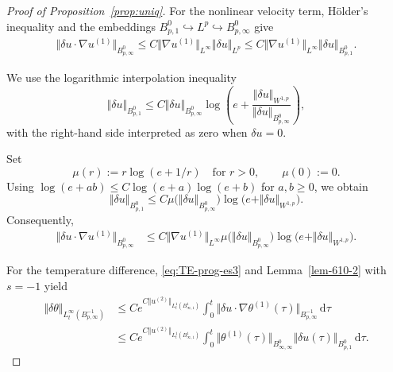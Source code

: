 \documentclass[reqno,11pt,a4paper]{amsart}
\newcommand{\dd}{\mathrm{d}}
\begin{document}
\begin{proof}[Proof of Proposition~\ref{prop:uniq}]
For the nonlinear velocity term,
H\"older's inequality and the embeddings
$B^0_{p,1}\hookrightarrow L^p
\hookrightarrow B^0_{p,\infty}$ give
\begin{align*}
  \Vert \delta u\cdot\nabla u^{(1)}\Vert _{B^0_{p,\infty}}
  \leq
  C\Vert \nabla u^{(1)}\Vert _{L^\infty}
  \Vert \delta u\Vert _{L^p}
  \leq
  C\Vert \nabla u^{(1)}\Vert _{L^\infty}
  \Vert \delta u\Vert _{B^0_{p,1}}.
\end{align*}

We use the logarithmic interpolation inequality
\[
  \Vert \delta u\Vert _{B^0_{p,1}}
  \leq
  C\Vert \delta u\Vert _{B^0_{p,\infty}}
  \log\left(
    e+
    \frac{\Vert \delta u\Vert _{W^{1,p}}}
         {\Vert \delta u\Vert _{B^0_{p,\infty}}}
  \right),
\]
with the right-hand side interpreted as zero
when $\delta u=0$.


Set
\[
  \mu(r):=r\log(e+1/r)\quad\text{for }r>0,
  \qquad \mu(0):=0.
\]
Using
$\log(e+ab)\leq C\log(e+a)\log(e+b)$
for $a,b\geq0$, we obtain
\[
  \Vert \delta u\Vert _{B^0_{p,1}}
  \leq
  C\mu\bigl(\Vert \delta u\Vert _{B^0_{p,\infty}}\bigr)
  \log\bigl(e+\Vert \delta u\Vert _{W^{1,p}}\bigr).
\]
Consequently,
\begin{equation}\label{eqn-log-interpol}
\begin{aligned}
  \Vert \delta u\cdot\nabla u^{(1)}\Vert _{B^0_{p,\infty}}
  &\leq
  C\Vert \nabla u^{(1)}\Vert _{L^\infty}
  \mu\bigl(\Vert \delta u\Vert _{B^0_{p,\infty}}\bigr)
  \log\bigl(e+\Vert \delta u\Vert _{W^{1,p}}\bigr).
\end{aligned}
\end{equation}

For the temperature difference,
\eqref{eq:TE-prog-es3}
and Lemma~\ref{lem-610-2} with $s=-1$ yield
\begin{equation}\label{eqn-theta-bound}
\begin{aligned}
  \Vert \delta\theta\Vert _{L^\infty_t(B^{-1}_{p,\infty})}
  &\leq
  Ce^{C\Vert u^{(2)}\Vert _{L^1_t(B^1_{\infty,1})}}
  \int_0^t
  \Vert \delta u\cdot\nabla\theta^{(1)}(\tau)
    \Vert _{B^{-1}_{p,\infty}}\,\dd\tau
  \\
  &\leq
  Ce^{C\Vert u^{(2)}\Vert _{L^1_t(B^1_{\infty,1})}}
  \int_0^t
  \Vert \theta^{(1)}(\tau)\Vert _{B^0_{\infty,\infty}}
  \Vert \delta u(\tau)\Vert _{B^0_{p,1}}\,\dd\tau.
\end{aligned}
\end{equation}


\end{proof}
\end{document}
